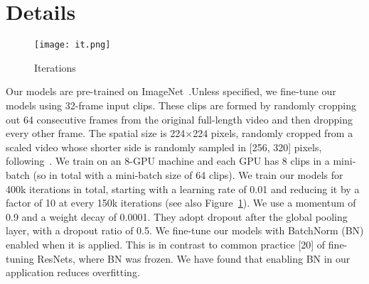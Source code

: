 \documentclass[10pt,twocolumn,letterpaper]{article}
\begin{document}
\section{Details}
  \begin{figure}[!htb]
  	\centering
  	\texttt{[image: it.png]}\\
  	\caption{Iterations}\label{Figure2}
  \end{figure}
Our models are pre-trained on ImageNet~\cite{name35}.Unless specified, we fine-tune our models using 32-frame input clips. These clips are formed by randomly cropping out 64 consecutive frames from the original full-length video and then dropping every other frame. The spatial size is 224×224
pixels, randomly cropped from a scaled video whose shorter
side is randomly sampled in [256, 320] pixels, following~\cite{name8}.
We train on an 8-GPU machine and each GPU has 8 clips in a
mini-batch (so in total with a mini-batch size of 64 clips). We
train our models for 400k iterations in total, starting with a
learning rate of 0.01 and reducing it by a factor of 10 at every
150k iterations (see also Figure~\ref{Figure2}). We use a momentum
of 0.9 and a weight decay of 0.0001. They adopt dropout after the global pooling layer, with a dropout ratio of
0.5. We fine-tune our models with BatchNorm (BN)
enabled when it is applied. This is in contrast to common
practice [20] of fine-tuning ResNets, where BN was frozen.
We have found that enabling BN in our application reduces
overfitting.



\end{document}
